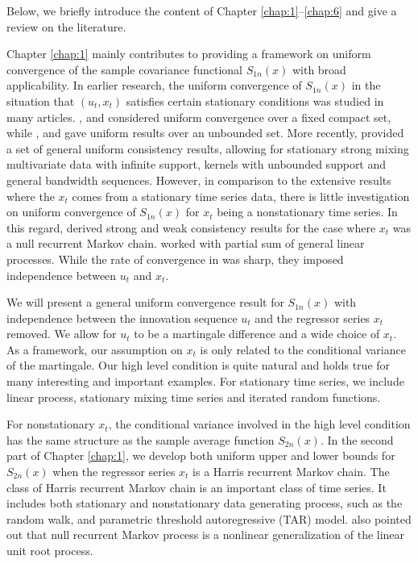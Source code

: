 Below, we briefly introduce the content of Chapter \ref{chap:1}--\ref{chap:6} and give a review on the literature. 

Chapter \ref{chap:1} mainly contributes to providing a framework on uniform convergence of the sample covariance functional $S_{1n}(x)$ with broad applicability. In earlier research, the uniform convergence of $S_{1n}(x)$ in the situation that $(u_t, x_t)$ satisfies certain stationary conditions was studied in many articles. \cite{liero1989}, \cite{peligrad1992} and \cite{nzedoukhan2004} considered uniform convergence over a fixed compact set, while \cite{masry1996}, \cite{bosq1998} and \cite{fanyao2003} gave uniform results over an unbounded set. More recently, \cite{hansen2008} provided a set of general uniform consistency results, allowing for stationary strong mixing multivariate data with infinite support, kernels with unbounded support and general bandwidth sequences. However, in comparison to the extensive results where the  $x_t$ comes from a stationary time series data, there is little investigation on uniform convergence of $S_{1n}(x)$ for $x_t$ being a nonstationary time series. In this regard, \cite{gaolitjostheim2011} derived strong and weak consistency results for the case where $x_t$ was a null recurrent Markov chain. \cite{wangwang2012} worked  with partial sum of general linear processes. While the rate of convergence   in \cite{gaolitjostheim2011} was sharp,  they imposed independence between $u_t$ and $x_t$.

We will present a general uniform convergence  result for $S_{1n}(x)$ with independence between the innovation sequence $u_t$ and the regressor series $x_t$ removed. We allow for $u_t$ to be a martingale difference and a wide choice of $x_t$. As a framework,  our  assumption on $x_t$ is only related to the conditional variance of the  martingale. Our high level condition is quite natural and holds true for many interesting and important examples. For stationary time series, we include linear process, stationary mixing time series and iterated random functions.

For nonstationary $x_t$, the conditional variance involved in the high level condition has the same structure as the sample average function $S_{2n}(x)$. In the second part of Chapter \ref{chap:1}, we develop both uniform upper and lower bounds for $S_{2n}(x)$ when the regressor series $x_t$ is a  Harris recurrent Markov chain. The class of Harris recurrent Markov chain is an important class of time series. It includes both stationary and nonstationary data generating process, such as the random walk, and parametric threshold autoregressive (TAR) model. \cite{myklebustkarlsentjostheim2012} also pointed out that null recurrent Markov process is a nonlinear generalization of the linear unit root process.


